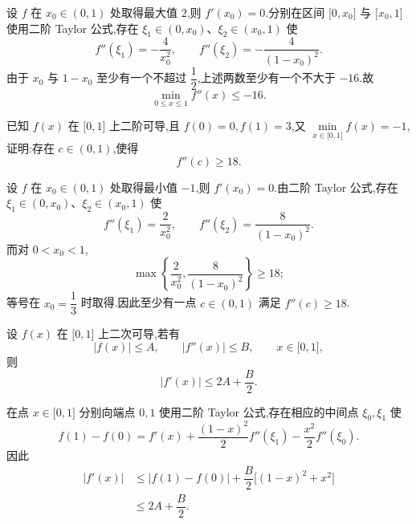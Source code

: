 \begin{solution}
    设 $f$ 在 $x_0\in(0,1)$ 处取得最大值 $2$,则 $f'(x_0)=0$.分别在区间 $\lbrack0,x_0\rbrack$ 与 $\lbrack x_0,1\rbrack$ 使用二阶 Taylor 公式,存在 $\xi_1\in(0,x_0)$、$\xi_2\in(x_0,1)$ 使
    \[
        f''(\xi_1)=-\dfrac{4}{x_0^2},
        \qquad
        f''(\xi_2)=-\dfrac{4}{(1-x_0)^2}.
    \]
    由于 $x_0$ 与 $1-x_0$ 至少有一个不超过 $\dfrac{1}{2}$,上述两数至少有一个不大于 $-16$.故
    \[
        \min\limits_{0\leq x\leq1}f''(x)\leq-16.
    \]
\end{solution}

\begin{example}
    已知 $f(x)$ 在 $\lbrack 0,1\rbrack$ 上二阶可导,且 $f(0)=0,f(1)=3$,又
    $\displaystyle\min\limits_{x\in\lbrack 0,1\rbrack}f(x)=-1$,证明:存在 $c\in(0,1)$,使得
    \[
        f''(c)\geq18.
    \]
\end{example}
\exampleblank

\begin{solution}
    设 $f$ 在 $x_0\in(0,1)$ 处取得最小值 $-1$,则 $f'(x_0)=0$.由二阶 Taylor 公式,存在 $\xi_1\in(0,x_0)$、$\xi_2\in(x_0,1)$ 使
    \[
        f''(\xi_1)=\dfrac{2}{x_0^2},
        \qquad
        f''(\xi_2)=\dfrac{8}{(1-x_0)^2}.
    \]
    而对 $0<x_0<1$,
    \[
        \max\left\{\dfrac{2}{x_0^2},\dfrac{8}{(1-x_0)^2}\right\}\geq18;
    \]
    等号在 $x_0=\dfrac{1}{3}$ 时取得.因此至少有一点 $c\in(0,1)$ 满足 $f''(c)\geq18$.
\end{solution}

\begin{example}[\markstar]
    设 $f(x)$ 在 $\lbrack 0,1\rbrack$ 上二次可导,若有
    \[
        |f(x)|\leq A,\qquad |f''(x)|\leq B,\qquad x\in\lbrack 0,1\rbrack,
    \]
    则
    \[
        |f'(x)|\leq2A+\dfrac{B}{2}.
    \]
\end{example}
\exampleblank

\begin{solution}
    在点 $x\in\lbrack0,1\rbrack$ 分别向端点 $0,1$ 使用二阶 Taylor 公式,存在相应的中间点 $\xi_0,\xi_1$ 使
    \[
        f(1)-f(0)
        =f'(x)+\dfrac{(1-x)^2}{2}f''(\xi_1)
        -\dfrac{x^2}{2}f''(\xi_0).
    \]
    因此
    \[
        \begin{aligned}
            |f'(x)|
             & \leq |f(1)-f(0)|
            +\dfrac{B}{2}\bigl[(1-x)^2+x^2\bigr] \\
             & \leq2A+\dfrac{B}{2}.
        \end{aligned}
    \]
\end{solution}

